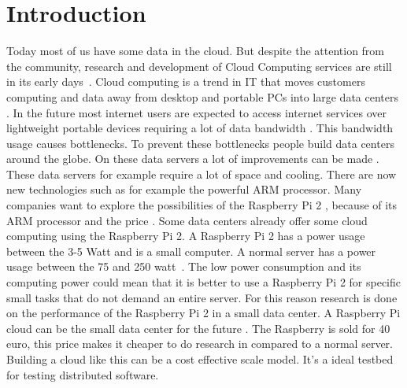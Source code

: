\documentclass{sig-alternate-br}
\begin{document}
\section{Introduction}
Today most of us have some data in the cloud. But despite the attention from the community, research and development of Cloud Computing services are still in its early days~\citep{tso:2013}. \newline
Cloud computing is a trend in IT that moves customers computing and data away from desktop and portable PCs into large data centers \citep{dikaiakos:2009}. In the future most internet users are expected to access internet services over lightweight portable devices requiring a lot of data bandwidth \cite{dikaiakos:2009}. This bandwidth usage causes bottlenecks. To prevent these bottlenecks people build data centers around the globe. On these data servers a lot of improvements can be made \cite{abrahamsson:2013,beloglazov:2010}. 
These data servers for example require a lot of space and cooling. There are now new technologies such as for example the powerful ARM processor. Many companies want to explore the possibilities of the Raspberry Pi 2 , because of its ARM processor and the price \cite{Pcextreme}. Some data centers already offer some cloud computing using the Raspberry Pi 2. \newline
A Raspberry Pi 2 has a power usage between the 3-5 Watt and is a small computer. A normal server has a power usage between the 75 and 250 watt~\cite{Pcextreme,beloglazov2012energy}. The low power consumption and its computing power could mean that it is better to use a Raspberry Pi 2 for specific small tasks that do not demand an entire server. For this reason research is done on the performance of the Raspberry Pi 2 in a small data center. \newline
A Raspberry Pi cloud can be the small data center for the future \cite{tso:2013}. The Raspberry is sold for 40 euro, this price makes it cheaper to do research in compared to a normal server. Building a cloud like this can be a cost effective scale model\cite{tso:2013}. It's a ideal testbed for testing distributed software. 
\end{document}
